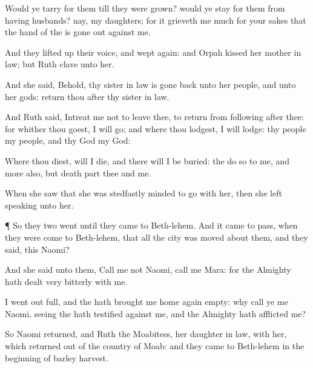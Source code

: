 {Would ye
tarry for
them till they were
grown? would ye
stay for
them from having
husbands? nay, my
daughters; for it
grieveth me
much for your sakes that the
hand of the
{} is gone
out against me.

And they lifted
up their
voice, and wept
again: and
Orpah
kissed her mother in
law; but
Ruth
clave unto her.

And she
said, Behold, thy sister in
law is gone
back unto her
people, and unto her
gods:
return thou
after thy sister in
law.

And
Ruth
said,
Intreat me not to
leave thee,
{} to
return from following
after thee: for whither thou
goest, I will
go; and where thou
lodgest, I will
lodge: thy
people
{} my
people, and thy
God my
God:

Where thou
diest, will I
die, and there will I be
buried: the
{}
do so to me, and
more also,
{} but
death
part thee and me.

When she
saw that she was stedfastly
minded to
go with her, then she
left
speaking unto her.


\par }{\PP {}¶ So they
two
went until they
came to
Beth-lehem. And it came to pass, when they were
come to
Beth-lehem, that all the
city was
moved about them, and they
said,
{} this
Naomi?

And she
said unto them,
Call me not
Naomi,
call me
Mara: for the
Almighty hath dealt
very
bitterly with me.

I went
out
full, and the
{} hath brought me home
again
empty: why
{}
call ye me
Naomi, seeing the
{} hath
testified against me, and the
Almighty hath
afflicted me?

So
Naomi
returned, and
Ruth the
Moabitess, her daughter in
law, with her, which
returned out of the
country of
Moab: and they
came to
Beth-lehem in the
beginning of
barley
harvest.




\par }
